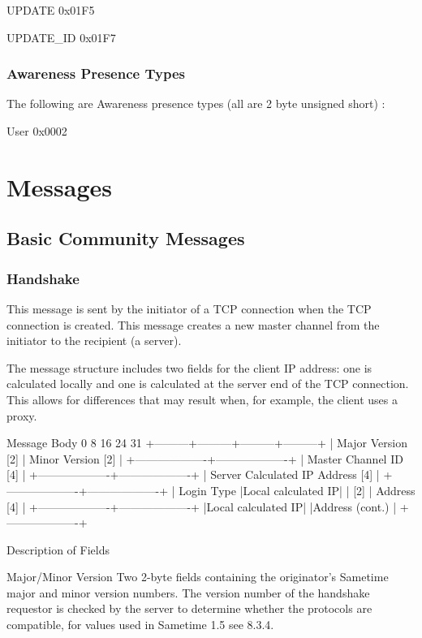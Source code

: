 \documentclass[titlepage,oneside]{book}
\begin{document}
UPDATE     0x01F5

UPDATE_ID  0x01F7

\subsubsection{Awareness Presence Types}

The following are Awareness presence types (all are 2 byte unsigned
short) :

User       0x0002

\section{Messages}
\subsection{Basic Community Messages}
\subsubsection{Handshake}

This message is sent by the initiator of a TCP connection when the TCP
connection is created. This message creates a new master channel from
the initiator to the recipient (a server).

The message structure includes two fields for the client IP address:
one is calculated locally and one is calculated at the server end of
the TCP connection. This allows for differences that may result when,
for example, the client uses a proxy.

Message Body
0         8         16        24      31
+---------+---------+---------+---------+
| Major Version [2] | Minor Version [2] |
+-------------------+-------------------+
|       Master Channel ID [4]           |
+-------------------+-------------------+
|      Server Calculated IP Address [4] |
+-------------------+-------------------+
|    Login Type     |Local calculated IP|
|        [2]        |   Address [4]     |
+-------------------+-------------------+
|Local calculated IP|
|Address (cont.)    |
+-------------------+

Description of Fields

Major/Minor Version
  Two 2-byte fields containing the originator's Sametime major and
  minor version numbers. The version number of the handshake requestor
  is checked by the server to determine whether the protocols are
  compatible, for values used in Sametime 1.5 see 8.3.4.
\end{document}
